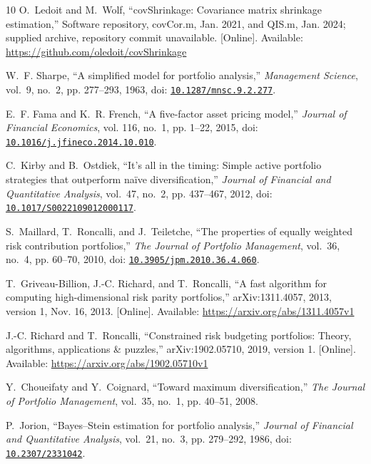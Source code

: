 \documentclass[letterpaper,journal]{IEEEtran}
\begin{document}
\begin{thebibliography}{10}
\BIBentryALTinterwordspacing
O.~Ledoit and M.~Wolf, ``{covShrinkage}: Covariance matrix shrinkage
  estimation,'' Software repository, {covCor.m}, Jan. 2021, and {QIS.m}, Jan.
  2024; supplied archive, repository commit unavailable. [Online]. Available:
  \url{https://github.com/oledoit/covShrinkage}
\BIBentrySTDinterwordspacing

W.~F. Sharpe, ``A simplified model for portfolio analysis,'' \emph{Management
  Science}, vol.~9, no.~2, pp. 277--293, 1963, doi:
  \href{https://doi.org/10.1287/mnsc.9.2.277}{\nolinkurl{10.1287/mnsc.9.2.277}}.

E.~F. Fama and K.~R. French, ``A five-factor asset pricing model,''
  \emph{Journal of Financial Economics}, vol. 116, no.~1, pp. 1--22, 2015, doi:
  \href{https://doi.org/10.1016/j.jfineco.2014.10.010}{\nolinkurl{10.1016/j.jfineco.2014.10.010}}.

C.~Kirby and B.~Ostdiek, ``It's all in the timing: Simple active portfolio
  strategies that outperform na{\"i}ve diversification,'' \emph{Journal of
  Financial and Quantitative Analysis}, vol.~47, no.~2, pp. 437--467, 2012,
  doi:
  \href{https://doi.org/10.1017/S0022109012000117}{\nolinkurl{10.1017/S0022109012000117}}.

S.~Maillard, T.~Roncalli, and J.~Teiletche, ``The properties of equally
  weighted risk contribution portfolios,'' \emph{The Journal of Portfolio
  Management}, vol.~36, no.~4, pp. 60--70, 2010, doi:
  \href{https://doi.org/10.3905/jpm.2010.36.4.060}{\nolinkurl{10.3905/jpm.2010.36.4.060}}.

\BIBentryALTinterwordspacing
T.~Griveau-Billion, J.-C. Richard, and T.~Roncalli, ``A fast algorithm for
  computing high-dimensional risk parity portfolios,'' arXiv:1311.4057, 2013,
  version 1, Nov. 16, 2013. [Online]. Available:
  \url{https://arxiv.org/abs/1311.4057v1}
\BIBentrySTDinterwordspacing

\BIBentryALTinterwordspacing
J.-C. Richard and T.~Roncalli, ``Constrained risk budgeting portfolios: Theory,
  algorithms, applications \& puzzles,'' arXiv:1902.05710, 2019, version 1.
  [Online]. Available: \url{https://arxiv.org/abs/1902.05710v1}
\BIBentrySTDinterwordspacing

Y.~Choueifaty and Y.~Coignard, ``Toward maximum diversification,'' \emph{The
  Journal of Portfolio Management}, vol.~35, no.~1, pp. 40--51, 2008.

P.~Jorion, ``{Bayes--Stein} estimation for portfolio analysis,'' \emph{Journal
  of Financial and Quantitative Analysis}, vol.~21, no.~3, pp. 279--292, 1986,
  doi: \href{https://doi.org/10.2307/2331042}{\nolinkurl{10.2307/2331042}}.


\end{thebibliography}
\end{document}
